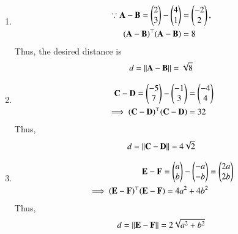 \begin{enumerate}
\item 
	\begin{align}
\because
		\mathbf{A} - \mathbf{B} = \begin{pmatrix}2\\3\end{pmatrix} - \begin{pmatrix}4\\1\end{pmatrix} &= \begin{pmatrix}-2\\2\end{pmatrix},		
\\
(\mathbf{A}-\mathbf{B})^\top (\mathbf{A}-\mathbf{B}) &= 8
	\end{align}
	Thus, the desired distance is 
	\begin{align}
		d=\left\lVert\mathbf{A}-\mathbf{B}\right\rVert =\sqrt{8}
	\end{align}
\item 
	\begin{align}
		\mathbf{C} - \mathbf{D} = \begin{pmatrix}-5\\7\end{pmatrix} - \begin{pmatrix}-1\\3\end{pmatrix} &= \begin{pmatrix}-4\\4\end{pmatrix}		
		\\
		\implies		(\mathbf{C}-\mathbf{D})^\top (\mathbf{C}-\mathbf{D}) &= 32
	\end{align}
Thus,	
	\begin{align}
		d=\left\lVert\mathbf{C}-\mathbf{D}\right\rVert
 =4\sqrt{2}
\end{align}	
%	
\item 
	\begin{align}
\mathbf{E} - \mathbf{F} = \begin{pmatrix}a\\b\end{pmatrix} - \begin{pmatrix}-a\\-b\end{pmatrix} &= \begin{pmatrix}2a\\2b\end{pmatrix}		
		\\
		\implies
		(\mathbf{E}-\mathbf{F})^\top (\mathbf{E}-\mathbf{F}) = 4a^2+4b^2 
	\end{align}
Thus,	
	\begin{align}
		d=\left\lVert\mathbf{E}-\mathbf{F}\right\rVert =
2\sqrt{a^2+b^2}
\end{align}	

\end{enumerate}
